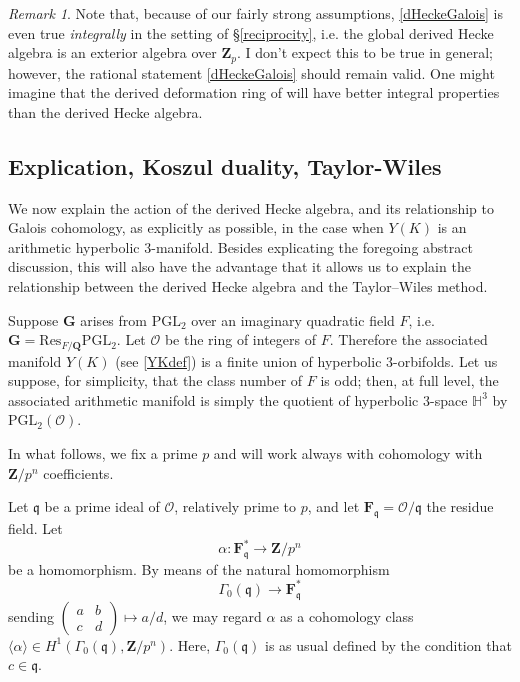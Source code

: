 \documentclass[10pt]{amsart}
\newcommand{\Z}{\mathbf{Z}}
\newcommand{\Q}{\mathbf{Q}}
\newcommand{\OO}{\mathcal{O}}
\newcommand{\PGL}{\mathrm{PGL}}
\theoremstyle{remark}
\newtheorem*{remark}{Remark}
\newcommand{\F}{\mathbf{F}}
\newcommand{\GG}{\mathbf{G}}
\begin{document}
 
 \begin{remark} 
 Note that, because of our fairly strong  assumptions, \eqref{dHeckeGalois} is even true {\em integrally} in the setting of \S \ref{reciprocity},
 i.e. the global derived Hecke algebra is an exterior algebra over $\Z_p$. I don't expect this to be true in general;
 however, the rational statement  \eqref{dHeckeGalois} should remain valid. One might imagine that  the derived deformation ring of 
 \cite{GV} will have better integral properties than the derived Hecke algebra. 
 \end{remark}
  
%
  
 \subsection{Explication, Koszul duality, Taylor-Wiles}  \label{sec:explication}
 
 We now explain the action of the derived Hecke algebra, and its relationship to Galois cohomology, 
 as explicitly as possible, in the case  when $Y(K)$ is an arithmetic hyperbolic $3$-manifold. Besides explicating
 the foregoing abstract discussion, this will also have the advantage that it allows us to explain the relationship
 between the derived Hecke algebra and the Taylor--Wiles method. 
 
   Suppose  $\GG$ arises from $\PGL_2$ over an imaginary quadratic field $F$, i.e. $\GG = \mathrm{Res}_{F/\Q} \PGL_2$. 
   Let  $\OO$ be the ring of integers of $F$. 
   Therefore the associated manifold $Y(K)$ (see \eqref{YKdef}) is a finite union of hyperbolic $3$-orbifolds. 
Let us suppose, for simplicity, that the class number of $F$ is odd; then, at full level, the associated arithmetic manifold
is simply the quotient of hyperbolic $3$-space $\mathbb{H}^3$ by $\PGL_2(\OO)$. 

In what follows, we fix a prime $p$ and will work always with cohomology with $\Z/p^n$ coefficients. 

Let $\mathfrak{q}$ be a prime ideal of $\OO$, relatively prime to $p$,  and let  $\F_{\mathfrak{q}} =  \OO/\mathfrak{q} $ the residue field. 
Let $$\alpha:   \mathbf{F}_{\mathfrak{q}} ^*  \longrightarrow \Z/p^n$$
be a homomorphism.   By means
of the natural homomorphism
$$\Gamma_0(\mathfrak{q}) \rightarrow  \F_{\mathfrak{q}}^*$$
sending $\left( \begin{array}{cc} a & b\\ c & d \end{array}  \right) \mapsto a/d$, 
we may regard $\alpha$ as a cohomology class $\langle \alpha \rangle \in H^1(\Gamma_0(\mathfrak{q}), \Z/p^n)$. 
Here, $\Gamma_0(\mathfrak{q})$ is as usual defined by the condition that $c \in \mathfrak{q}$. 
\medskip
\end{document}
